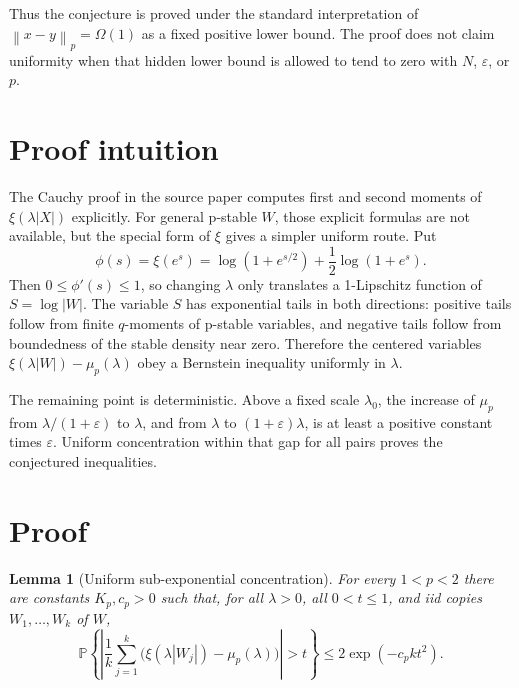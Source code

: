 \documentclass[11pt]{article}
\newtheorem{lemma}{Lemma}
\newcommand{\Prob}{\mathbb{P}}
\newcommand{\norm}[1]{\left\lVert #1\right\rVert}
\newcommand{\abs}[1]{\left\lvert #1\right\rvert}
\newcommand{\eps}{\varepsilon}
\begin{document}
Thus the conjecture is proved under the standard interpretation of
\(\norm{x-y}_p=\Omega(1)\) as a fixed positive lower bound.  The proof does not
claim uniformity when that hidden lower bound is allowed to tend to zero with
\(N\), \(\eps\), or \(p\).

\section{Proof intuition}

The Cauchy proof in the source paper computes first and second moments of
\(\xi(\lambda\abs X)\) explicitly.  For general p-stable \(W\), those explicit
formulas are not available, but the special form of \(\xi\) gives a simpler
uniform route.  Put
\[
   \phi(s)=\xi(e^s)
      =\log(1+e^{s/2})+\frac12\log(1+e^s).
\]
Then \(0\leq\phi'(s)\leq1\), so changing \(\lambda\) only translates a
1-Lipschitz function of \(S=\log\abs W\).  The variable \(S\) has exponential
tails in both directions: positive tails follow from finite \(q\)-moments of
p-stable variables, and negative tails follow from boundedness of the stable
density near zero.  Therefore the centered variables
\(\xi(\lambda\abs W)-\mu_p(\lambda)\) obey a Bernstein inequality uniformly in
\(\lambda\).

The remaining point is deterministic.  Above a fixed scale \(\lambda_0\), the
increase of \(\mu_p\) from \(\lambda/(1+\eps)\) to \(\lambda\), and from
\(\lambda\) to \((1+\eps)\lambda\), is at least a positive constant times
\(\eps\).  Uniform concentration within that gap for all pairs proves the
conjectured inequalities.

\section{Proof}

\begin{lemma}[Uniform sub-exponential concentration]
\label{lem:concentration}
For every \(1<p<2\) there are constants \(K_p,c_p>0\) such that, for all
\(\lambda>0\), all \(0<t\leq1\), and iid copies \(W_1,\ldots,W_k\) of \(W\),
\[
\Prob\left\{
\left|\frac1k\sum_{j=1}^k
\bigl(\xi(\lambda\abs{W_j})-\mu_p(\lambda)\bigr)\right|>t
\right\}
\leq 2\exp(-c_p k t^2).
\]
\end{lemma}
\end{document}
